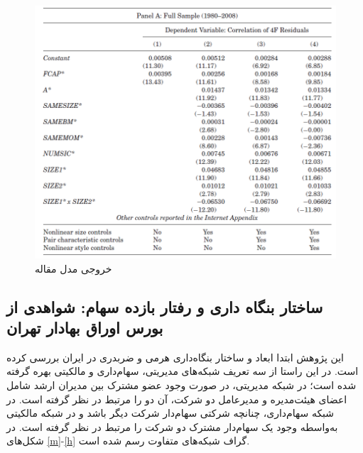 \documentclass[12pt]{article}
\begin{document}
  
  \begin{figure}[htbp]
  \centering
  \includegraphics[width=\columnwidth]{Table1.png}
  \caption{ خروجی مدل مقاله  }
  \label{g1}
 
  \end{figure}  
\FloatBarrier


\subsection{ساختار بنگاه داری و رفتار بازده سهام: شواهدی از بورس اوراق بهادار تهران}
\label{s1.2}
این پژوهش ابتدا ابعاد و ساختار بنگاه‌داری هرمی و ضربدری در ایران بررسی کرده است. در این راستا از سه تعریف شبکه‌های مدیریتی، سهام‌داری و مالکیتی بهره گرفته شده است؛ در شبکه مدیریتی، در صورت وجود عضو مشترک بین مدیران ارشد شامل اعضای هیئت‌مدیره و مدیرعامل دو شرکت، آن دو را مرتبط در نظر گرفته است. در شبکه سهام‌داری، چنانچه شرکتی سهام‌دار شرکت دیگر باشد و در شبکه مالکیتی به‌واسطه وجود یک سهام‌دار مشترک دو شرکت را مرتبط در نظر گرفته است. در شکل‌های
\ref{m}-\ref{h}
گراف شبکه‌های متفاوت رسم شده است.
\end{document}
